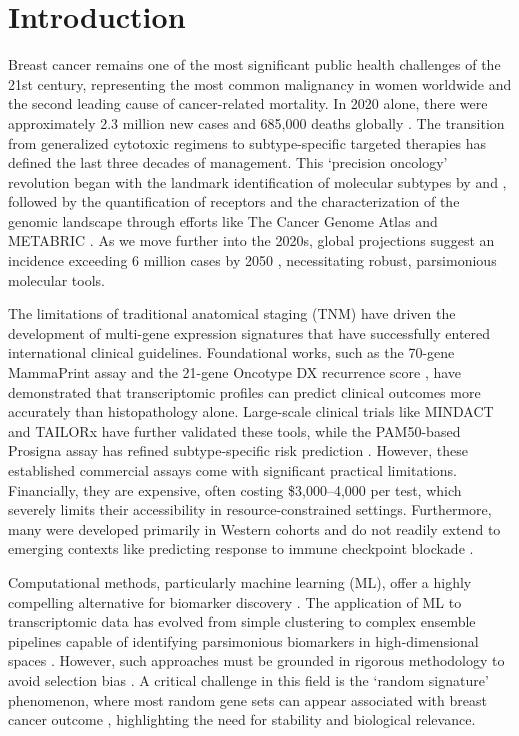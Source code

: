 \documentclass[a4paper,fleqn]{cas-dc}
\begin{document}
\section{Introduction}\label{sec:intro}

Breast cancer remains one of the most significant public health challenges of the 21st century, representing the most common malignancy in women worldwide and the second leading cause of cancer-related mortality. In 2020 alone, there were approximately 2.3 million new cases and 685,000 deaths globally \citep{sung2021}. The transition from generalized cytotoxic regimens to subtype-specific targeted therapies has defined the last three decades of management. This `precision oncology' revolution began with the landmark identification of molecular subtypes by \citet{perou2000} and \citet{sorlie2001}, followed by the quantification of receptors and the characterization of the genomic landscape through efforts like The Cancer Genome Atlas \citep{tcga2012} and METABRIC \citep{curtis2012}. As we move further into the 2020s, global projections suggest an incidence exceeding 6 million cases by 2050 \citep{yousefi2025}, necessitating robust, parsimonious molecular tools.

The limitations of traditional anatomical staging (TNM) have driven the development of multi-gene expression signatures that have successfully entered international clinical guidelines. Foundational works, such as the 70-gene MammaPrint assay \citep{vantveer2002} and the 21-gene Oncotype DX recurrence score \citep{paik2004}, have demonstrated that transcriptomic profiles can predict clinical outcomes more accurately than histopathology alone. Large-scale clinical trials like MINDACT \citep{cardoso2016} and TAILORx \citep{sparano2018} have further validated these tools, while the PAM50-based Prosigna assay has refined subtype-specific risk prediction \citep{wallden2015,sotiriou2009}. However, these established commercial assays come with significant practical limitations. Financially, they are expensive, often costing \$3,000--4,000 per test, which severely limits their accessibility in resource-constrained settings. Furthermore, many were developed primarily in Western cohorts and do not readily extend to emerging contexts like predicting response to immune checkpoint blockade \citep{parker2009,dai2017}.

Computational methods, particularly machine learning (ML), offer a highly compelling alternative for biomarker discovery \citep{kourou2015,cruz2006}. The application of ML to transcriptomic data has evolved from simple clustering to complex ensemble pipelines capable of identifying parsimonious biomarkers in high-dimensional spaces \citep{libbrecht2015,sun2020}. However, such approaches must be grounded in rigorous methodology to avoid selection bias \citep{ambroise2002}. A critical challenge in this field is the `random signature' phenomenon, where most random gene sets can appear associated with breast cancer outcome \citep{venet2011}, highlighting the need for stability and biological relevance.
\end{document}
